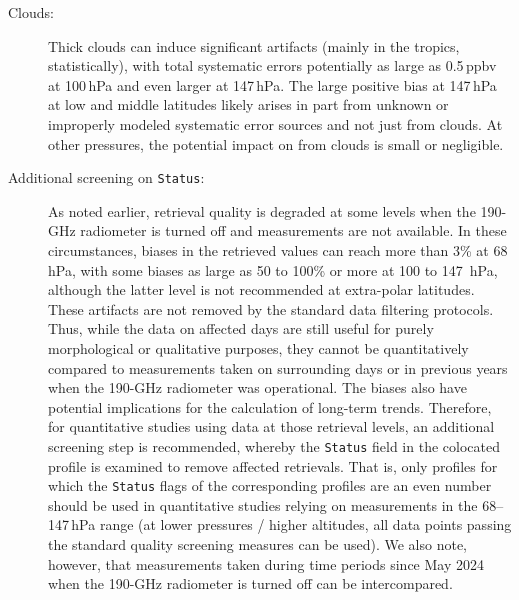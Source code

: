 \begin{nofloatpages}
\begin{description}
  \item[Clouds:] Thick clouds can induce significant artifacts (mainly in the tropics, statistically), with total systematic errors potentially as large as 0.5\,ppbv at 100\,hPa and even larger at 147\,hPa. The large positive  bias at 147\,hPa at low and middle latitudes likely arises in part from unknown or improperly modeled systematic error sources and not just from clouds. At other pressures, the potential impact on  from clouds is small or negligible.
  
  \item[Additional screening on  \texttt{Status}:] As noted earlier,  retrieval quality is degraded at some levels when the \mbox{190-GHz} radiometer is turned off and  measurements are not available. In these circumstances, biases in the retrieved  values can reach more than 3\%  at 68\,hPa, with some biases as large as 50 to 100\% or more at 100 to 147 \,hPa, although the latter level is not recommended at extra-polar latitudes. These artifacts are not removed by the standard  data filtering protocols. Thus, while the  data on affected days are still useful for purely morphological or qualitative purposes, they cannot be quantitatively compared to measurements taken on surrounding days or in previous years when the \mbox{190-GHz} radiometer was operational. The biases also have potential implications for the calculation of long-term trends. Therefore, for quantitative studies using  data at those retrieval levels, an additional screening step is recommended, whereby the \texttt{Status} field in the colocated  profile is examined to remove affected  retrievals. That is, only  profiles for which the \texttt{Status} flags of the corresponding  profiles are an even number should be used in quantitative studies relying on  measurements in the 68--147\,hPa range (at lower pressures / higher altitudes, all  data points passing the standard quality screening measures can be used). We also note, however, that measurements taken during time periods since May 2024 when the \mbox{190-GHz} radiometer is turned off can be intercompared.
\end{description}
\end{nofloatpages}

